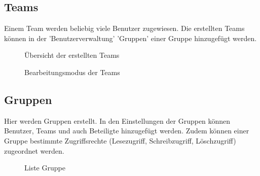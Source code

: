\pagebreak
\subsection{Teams}

Einem Team werden beliebig viele Benutzer zugewiesen. Die erstellten Teams können in der 'Benutzerverwaltung' 'Gruppen' einer Gruppe hinzugefügt werden.

\begin{figure}[H]
\caption{Übersicht der erstellten Teams}
\end{figure}

\begin{figure}[H]
\caption{Bearbeitungsmodus der Teams}
\end{figure}

\clearpage
\subsection{Gruppen}

Hier werden Gruppen erstellt. In den Einstellungen der Gruppen können Benutzer, Teams und auch Beteiligte hinzugefügt werden. Zudem können einer Gruppe bestimmte Zugriffsrechte (Lesezugriff, Schreibzugriff, Löschzugriff) zugeordnet werden.

\begin{figure}[H]
\caption{Liste Gruppe}
\end{figure}

